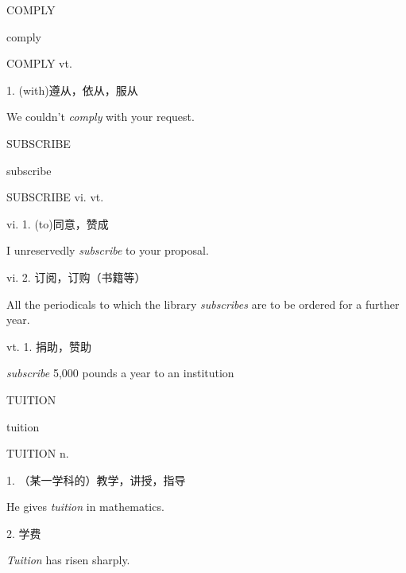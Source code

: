 \begin{flashcard}{
COMPLY

comply
}
\begin{center}
COMPLY vt. 
\end{center}
1. (with)遵从，依从，服从

We couldn't \textit{comply} with your request.

\end{flashcard}
\begin{flashcard}{
SUBSCRIBE

subscribe
}
\begin{center}
SUBSCRIBE vi. vt. 
\end{center}
vi. 1. (to)同意，赞成

I unreservedly \textit{subscribe} to your proposal.

vi. 2. 订阅，订购（书籍等）

All the periodicals to which the library \textit{subscribes} are to be ordered for a further year.

vt. 1. 捐助，赞助

\textit{subscribe} 5,000 pounds a year to an institution

\end{flashcard}
\begin{flashcard}{
TUITION

tuition
}
\begin{center}
TUITION n. 
\end{center}
1. （某一学科的）教学，讲授，指导

He gives \textit{tuition} in mathematics.

2. 学费

\textit{Tuition} has risen sharply.

\end{flashcard}
